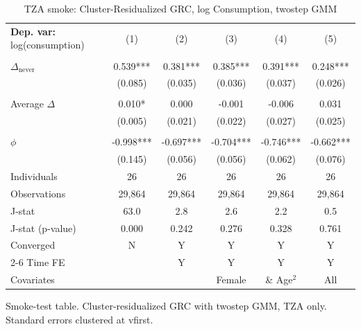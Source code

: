 \begin{table}[htbp] \centering \begin{threeparttable}
 \caption{TZA smoke: Cluster-Residualized GRC, log Consumption, twostep GMM} 
 \label{tab:smoke_verdier_robust_twostep_TZA} 
\begin{tabular}{l ccccc} \toprule  \textbf{Dep. var:}  log(consumption) 
                    &\multicolumn{1}{c}{(1)}   &\multicolumn{1}{c}{(2)}   &\multicolumn{1}{c}{(3)}   &\multicolumn{1}{c}{(4)}   &\multicolumn{1}{c}{(5)}   \\
                    &               &               &               &               &               \\
\addlinespace
$\Delta_{\text{never}}$&       0.539***&       0.381***&       0.385***&       0.391***&       0.248***\\
                    &     (0.085)   &     (0.035)   &     (0.036)   &     (0.037)   &     (0.026)   \\
                    &               &               &               &               &               \\
\addlinespace
Average $\Delta$    &       0.010*  &       0.000   &      -0.001   &      -0.006   &       0.031   \\
                    &     (0.005)   &     (0.021)   &     (0.022)   &     (0.027)   &     (0.025)   \\
                    &               &               &               &               &               \\
\addlinespace
$\phi$              &      -0.998***&      -0.697***&      -0.704***&      -0.746***&      -0.662***\\
                    &     (0.145)   &     (0.056)   &     (0.056)   &     (0.062)   &     (0.076)   \\
\addlinespace
Individuals         &          26   &          26   &          26   &          26   &          26   \\
Observations        &      29,864   &      29,864   &      29,864   &      29,864   &      29,864   \\
J-stat              &        63.0   &         2.8   &         2.6   &         2.2   &         0.5   \\
J-stat (p-value)    &       0.000   &       0.242   &       0.276   &       0.328   &       0.761   \\
Converged           &           N   &           Y   &           Y   &           Y   &           Y   \\
\cmidrule{2-6} Time FE & & Y & Y & Y & Y \\ Covariates & & & Female & \& Age$^2$ & All \\ \bottomrule \end{tabular} \begin{tablenotes}[flushleft] \footnotesize \item{Smoke-test table. Cluster-residualized GRC with twostep GMM, TZA only. Standard errors clustered at vfirst.} \end{tablenotes} \end{threeparttable} \end{table}
